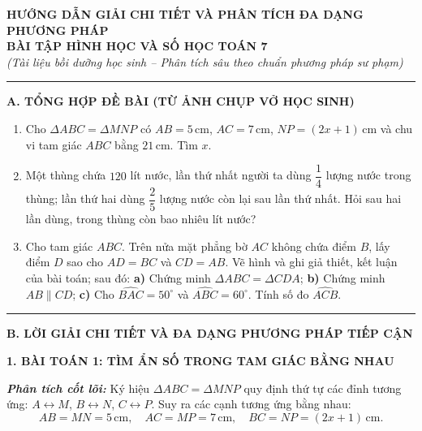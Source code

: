 \documentclass[12pt,a4paper]{article}
\begin{document}
\begin{center}
  {\bfseries\large HƯỚNG DẪN GIẢI CHI TIẾT VÀ PHÂN TÍCH ĐA DẠNG PHƯƠNG PHÁP}\\
  \vspace{1mm}
  {\bfseries\Large BÀI TẬP HÌNH HỌC VÀ SỐ HỌC TOÁN 7}\\
  \vspace{1mm}
  \textit{(Tài liệu bồi dưỡng học sinh -- Phân tích sâu theo chuẩn phương pháp sư phạm)}
\end{center}
\vspace{-2mm}
\hrule
\vspace{2mm}

\noindent\textbf{\large A. TỔNG HỢP ĐỀ BÀI (TỪ ẢNH CHỤP VỞ HỌC SINH)}

\begin{enumerate}[label=\textbf{Bài \arabic*.}, leftmargin=*, itemsep=2pt, parsep=0pt]
  \item Cho $\Delta ABC = \Delta MNP$ có $AB = 5\,\text{cm}$, $AC = 7\,\text{cm}$, $NP = (2x + 1)\,\text{cm}$ và chu vi tam giác $ABC$ bằng $21\,\text{cm}$. Tìm $x$.
  \item Một thùng chứa $120$ lít nước, lần thứ nhất người ta dùng $\dfrac{1}{4}$ lượng nước trong thùng; lần thứ hai dùng $\dfrac{2}{5}$ lượng nước còn lại sau lần thứ nhất. Hỏi sau hai lần dùng, trong thùng còn bao nhiêu lít nước?
  \item Cho tam giác $ABC$. Trên nửa mặt phẳng bờ $AC$ không chứa điểm $B$, lấy điểm $D$ sao cho $AD = BC$ và $CD = AB$.
  Vẽ hình và ghi giả thiết, kết luận của bài toán; sau đó:
  \textbf{a)} Chứng minh $\Delta ABC = \Delta CDA$;
  \textbf{b)} Chứng minh $AB \parallel CD$;
  \textbf{c)} Cho $\widehat{BAC} = 50^\circ$ và $\widehat{ABC} = 60^\circ$. Tính số đo $\widehat{ACB}$.
\end{enumerate}

\vspace{1.5mm}
\hrule
\vspace{2mm}

\noindent\textbf{\large B. LỜI GIẢI CHI TIẾT VÀ ĐA DẠNG PHƯƠNG PHÁP TIẾP CẬN}

\vspace{1.5mm}
\noindent\textbf{\large 1. BÀI TOÁN 1: TÌM ẨN SỐ TRONG TAM GIÁC BẰNG NHAU}

\noindent\textbf{\textit{Phân tích cốt lõi:}} Ký hiệu $\Delta ABC = \Delta MNP$ quy định thứ tự các đỉnh tương ứng: $A \leftrightarrow M$, $B \leftrightarrow N$, $C \leftrightarrow P$.
Suy ra các cạnh tương ứng bằng nhau:
\[
  AB = MN = 5\,\text{cm}, \quad AC = MP = 7\,\text{cm}, \quad BC = NP = (2x + 1)\,\text{cm}.
\]
\end{document}
